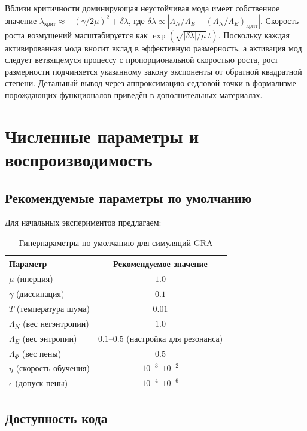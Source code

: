 \documentclass[11pt,a4paper]{article}
\theoremstyle{plain}
\theoremstyle{definition}
\theoremstyle{remark}
\begin{document}
Вблизи критичности доминирующая неустойчивая мода имеет собственное значение $\lambda_{\text{крит}} \approx -(\gamma/2\mu)^2 + \delta\lambda$, где $\delta\lambda \propto |\Lambda_N/\Lambda_E - (\Lambda_N/\Lambda_E)_{\text{крит}}|$. Скорость роста возмущений масштабируется как $\exp(\sqrt{|\delta\lambda|/\mu} \, t)$. Поскольку каждая активированная мода вносит вклад в эффективную размерность, а активация мод следует ветвящемуся процессу с пропорциональной скоростью роста, рост размерности подчиняется указанному закону экспоненты от обратной квадратной степени. Детальный вывод через аппроксимацию седловой точки в формализме порождающих функционалов приведён в дополнительных материалах.

\section{Численные параметры и воспроизводимость}
\label{app:reproducibility}

\subsection{Рекомендуемые параметры по умолчанию}

Для начальных экспериментов предлагаем:
\begin{table}[H]
\centering
\caption{Гиперпараметры по умолчанию для симуляций GRA}
\label{tab:defaults}
\begin{tabular}{lc}
\toprule
Параметр & Рекомендуемое значение \\
\midrule
$\mu$ (инерция) & $1.0$ \\
$\gamma$ (диссипация) & $0.1$ \\
$T$ (температура шума) & $0.01$ \\
$\Lambda_N$ (вес негэнтропии) & $1.0$ \\
$\Lambda_E$ (вес энтропии) & $0.1$--$0.5$ (настройка для резонанса) \\
$\Lambda_\Phi$ (вес пены) & $0.5$ \\
$\eta$ (скорость обучения) & $10^{-3}$--$10^{-2}$ \\
$\epsilon$ (допуск пены) & $10^{-4}$--$10^{-6}$ \\
\bottomrule
\end{tabular}
\end{table}

\subsection{Доступность кода}
\end{document}
